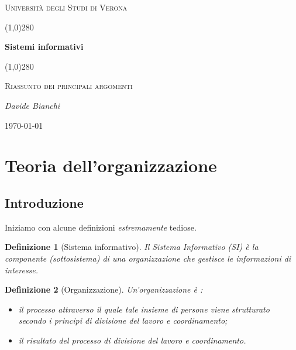 \documentclass[a4paper, 10pt]{article}
\newtheorem{definit}{Definizione}[subsection]
\begin{document}
	\clearpage
	\begin{titlepage}
		\centering
		\vspace*{\fill}
		{\scshape\LARGE Università degli Studi di Verona \par}
		\vspace{1.5cm}
		\line(1,0){280} \\
		{\huge\bfseries Sistemi informativi\par}
		\line(1,0){280} \\
		\vspace{0.5cm}
		{\scshape\Large Riassunto dei principali argomenti\par}
		\vspace{2cm}
		{\Large\itshape Davide Bianchi\par}
		\vspace{1cm}
		
		\vspace{5cm}
		\vspace*{\fill}
		{\large \today\par}
	\end{titlepage}
	\thispagestyle{empty}
	\newpage
	\tableofcontents
	\newpage
	
	
	\section{Teoria dell'organizzazione}
	\subsection{Introduzione}
	Iniziamo con alcune definizioni \textit{estremamente} tediose.
	\begin{definit}[Sistema informativo]
		Il Sistema Informativo (SI) è la componente (sottosistema) di una organizzazione che gestisce le informazioni di interesse.
	\end{definit}
	
	\begin{definit}[Organizzazione]
		Un’organizzazione è : \begin{itemize}
			\item il processo attraverso il quale tale insieme di persone viene strutturato secondo i principi di divisione del lavoro e coordinamento;
			\item il risultato del processo di divisione del lavoro e coordinamento.
		\end{itemize}
	\end{definit}
	
\end{document}
